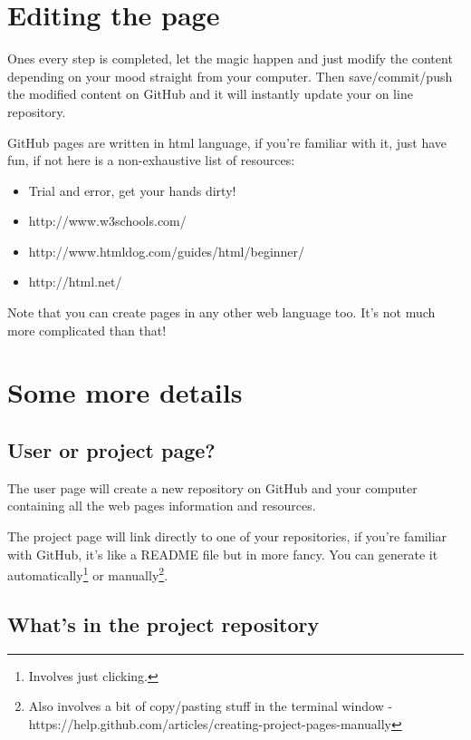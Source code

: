 \documentclass[a4paper,11pt]{article}
\begin{document}
\section{Editing the page}
\setlength{\parindent}{5ex}
Ones every step is completed, let the magic happen and just modify the content depending on your mood straight from your computer. Then save/commit/push the modified content on GitHub and it will instantly update your on line repository.

GitHub pages are written in html language, if you're familiar with it, just have fun, if not here is a non-exhaustive list of resources:
\par
\begin{itemize}
    \item{Trial and error, get your hands dirty!}
    \item{http://www.w3schools.com/}
    \item{http://www.htmldog.com/guides/html/beginner/}
    \item{http://html.net/}
\end{itemize}
Note that you can create pages in any other web language too.
It's not much more complicated than that!

\newpage

\section{Some more details}
\subsection{User or project page?}
\setlength{\parindent}{5ex}
The user page will create a new repository on GitHub and your computer containing all the web pages information and resources.

The project page will link directly to one of your repositories, if you're familiar with GitHub, it's like a README file but in more fancy.
You can generate it automatically\footnote{Involves just clicking.} or manually\footnote{Also involves a bit of copy/pasting stuff in the terminal window - https://help.github.com/articles/creating-project-pages-manually
}.
\par

\subsection{What's in the project repository}
\end{document}
